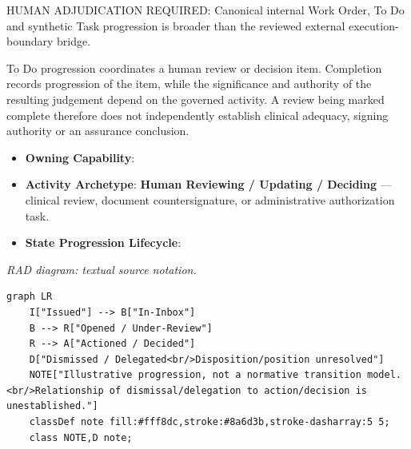 HUMAN ADJUDICATION REQUIRED: Canonical internal Work Order, To Do and synthetic Task progression is broader than the reviewed external execution-boundary bridge.



To Do progression coordinates a human review or decision item. Completion records progression of the item, while the significance and authority of the resulting judgement depend on the governed activity. A review being marked complete therefore does not independently establish clinical adequacy, signing authority or an assurance conclusion.



\begin{itemize}

\item
\textbf{Owning Capability}: \texttt{}



\item
\textbf{Activity Archetype}: \textbf{Human Reviewing /\allowbreak{} Updating /\allowbreak{} Deciding} — clinical review, document countersignature, or administrative authorization task.



\item
\textbf{State Progression Lifecycle}:



\end{itemize}

\textit{RAD diagram: textual source notation.}
\begin{Verbatim}[breaklines,fontsize=\footnotesize]
graph LR
    I["Issued"] --> B["In-Inbox"]
    B --> R["Opened / Under-Review"]
    R --> A["Actioned / Decided"]
    D["Dismissed / Delegated<br/>Disposition/position unresolved"]
    NOTE["Illustrative progression, not a normative transition model.<br/>Relationship of dismissal/delegation to action/decision is unestablished."]
    classDef note fill:#fff8dc,stroke:#8a6d3b,stroke-dasharray:5 5;
    class NOTE,D note;
\end{Verbatim}

